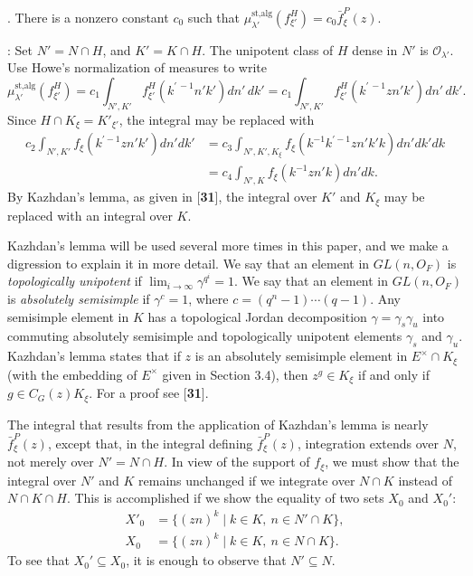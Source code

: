 \documentclass{amsart}
\begin{document}
.  There is a nonzero constant $c_0$ such that
$\mu_{\lambda'}^{\text{st,alg}}(f^H_{\xi'}) = c_0 \bar f_\xi^P(z)$.
\finishproclaim

:  Set $N'=N\cap H$, and $K'=K\cap H$.  The unipotent
class of $H$ dense in $N'$ is ${\mathcal O}_{\lambda'}$.
Use Howe's normalization
of measures to write 
$$
\mu^{\text{st,alg}}_{\lambda'}(f^H_{\xi'}) = c_1\int_{N',K'} 
	f_{\xi'}^H (k^{\prime\, -1}n'k')dn'\,dk' = c_1\int_{N',K'}
	f_{\xi'}^H (k^{\prime\,-1}zn'k')dn'\,dk'.$$
%
Since $H\cap K_\xi=K'_{\xi'}$, the integral may be replaced with
\begin{align*}
c_2\int_{N',K'}f_\xi(k^{\prime-1}zn'k')dn'dk' &=
 c_3\int_{N',K',K_\xi} f_\xi(k^{-1}k^{\prime-1}zn'k'k) dn'dk'dk\\&=
 c_4\int_{N',K} f_\xi(k^{-1}zn'k)dn'dk.
\end{align*}
By Kazhdan's lemma, as given in [{\bf 31}], 
the integral over $K'$ and $K_\xi$ may be replaced  with
an integral over $K$.  

Kazhdan's lemma will be used several more times in this paper, and
we make a digression to explain it in more detail.
We say that an element in $GL(n,O_F)$ is {\it topologically unipotent} if
$\lim_{i\to\infty}\gamma^{q^i} = 1$.  We say that an element in $GL(n,O_F)$
is {\it absolutely semisimple} if $\gamma^c=1$, where $c = (q^n-1)\cdots (q-1)$.
Any semisimple element in $K$ has a topological Jordan decomposition
$\gamma=\gamma_s\gamma_u$ into commuting absolutely semisimple and topologically
unipotent elements $\gamma_s$ and $\gamma_u$.  Kazhdan's lemma states
that if $z$ is an absolutely semisimple element in $E^\times\cap K_\xi$
(with the embedding of $E^\times$ given in Section 3.4), then $z^g\in K_\xi$
if and only if $g\in C_G(z)K_\xi$.  For a proof see [{\bf 31}].

The integral that results from the application of Kazhdan's lemma is nearly $\bar f_\xi^P(z)$,
except that, in the integral defining $\bar f_\xi^P(z)$, integration
extends over $N$, not merely over $N'=N\cap H$.  In view of the support
of $f_\xi$, we must show that the integral over $N'$ and $K$ remains unchanged
if we integrate over $N\cap K$ instead of $N\cap K\cap H$.  This
is accomplished if we show the equality of two sets $X_0$ and $X_0'$:
\begin{align*}
   	X'_0 &= \{(zn)^k \mid k\in K,\ n\in N'\cap K\},\\
	X_0 &= \{ (zn)^k \mid k\in K, \ n\in N\cap K\}.
\end{align*}
%
To see that $X_0'\subseteq X_0$, it is enough to observe that
$N'\subseteq N$.  
\end{document}
